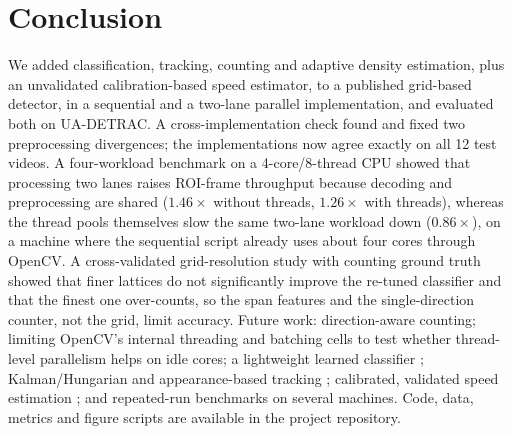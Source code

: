 \documentclass[conference]{IEEEtran}
\begin{document}
\section{Conclusion}
\label{sec:conclusion}
We added classification, tracking, counting and adaptive density
estimation, plus an unvalidated calibration-based speed estimator, to a
published grid-based detector, in a sequential and a two-lane parallel
implementation, and evaluated both on UA-DETRAC. A
cross-implementation check found and fixed two preprocessing divergences;
the implementations now agree exactly on all 12 test videos. A four-workload
benchmark on a 4-core/8-thread CPU showed that processing two lanes
raises ROI-frame throughput because decoding and preprocessing are shared
($1.46\times$ without threads, $1.26\times$ with threads), whereas the
thread pools themselves slow the same two-lane workload down
($0.86\times$), on a machine where the sequential script already uses
about four cores through OpenCV. A cross-validated grid-resolution study
with counting ground truth showed that finer lattices do not
significantly improve the re-tuned classifier and that the finest one
over-counts, so the span features and the single-direction counter, not
the grid, limit accuracy. Future work: direction-aware counting; limiting OpenCV's internal threading and
batching cells to test whether thread-level parallelism helps on idle
cores; a lightweight learned classifier \cite{chang2025,macko2025};
Kalman/Hungarian and appearance-based tracking \cite{bewley2016,wojke2017};
calibrated, validated speed estimation \cite{kamil2024}; and repeated-run
benchmarks on several machines. Code, data, metrics and figure scripts
are available in the project repository.
\end{document}
